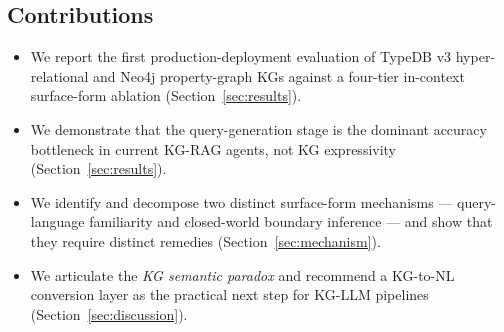 \subsection*{Contributions}

\begin{itemize}
\item We report the first production-deployment evaluation of
      TypeDB v3 hyper-relational and Neo4j property-graph KGs
      against a four-tier in-context surface-form ablation
      (Section~\ref{sec:results}).
\item We demonstrate that the query-generation stage is the
      dominant accuracy bottleneck in current KG-RAG agents,
      not KG expressivity (Section~\ref{sec:results}).
\item We identify and decompose two distinct surface-form
      mechanisms — query-language familiarity and closed-world
      boundary inference — and show that they require distinct
      remedies (Section~\ref{sec:mechanism}).
\item We articulate the \emph{KG semantic paradox} and recommend
      a KG-to-NL conversion layer as the practical next step for
      KG-LLM pipelines (Section~\ref{sec:discussion}).
\end{itemize}
